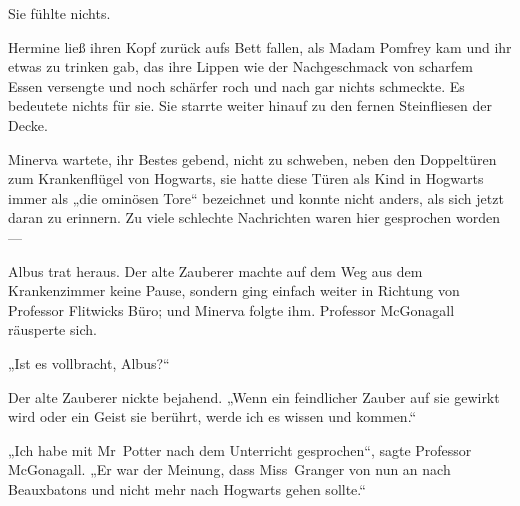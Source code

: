 Sie fühlte nichts.

Hermine ließ ihren Kopf zurück aufs Bett fallen, als Madam Pomfrey kam und ihr etwas zu trinken gab, das ihre Lippen wie der Nachgeschmack von scharfem Essen versengte und noch schärfer roch und nach gar nichts schmeckte.
Es bedeutete nichts für sie. Sie starrte weiter hinauf zu den fernen Steinfliesen der Decke.

\later

Minerva wartete, ihr Bestes gebend, nicht zu schweben, neben den Doppeltüren zum Krankenflügel von Hogwarts, sie hatte diese Türen als Kind in Hogwarts immer als „die ominösen Tore“ bezeichnet und konnte nicht anders, als sich jetzt daran zu erinnern. Zu viele schlechte Nachrichten waren hier gesprochen worden—

Albus trat heraus. Der alte Zauberer machte auf dem Weg aus dem Krankenzimmer keine Pause, sondern ging einfach weiter in Richtung von Professor Flitwicks Büro; und Minerva folgte ihm. Professor McGonagall räusperte sich.

„Ist es vollbracht, Albus?“

Der alte Zauberer nickte bejahend. „Wenn ein feindlicher Zauber auf sie gewirkt wird oder ein Geist sie berührt, werde ich es wissen und kommen.“

„Ich habe mit Mr~Potter nach dem Unterricht gesprochen“, sagte Professor McGonagall. „Er war der Meinung, dass Miss~Granger von nun an nach Beauxbatons und nicht mehr nach Hogwarts gehen sollte.“

